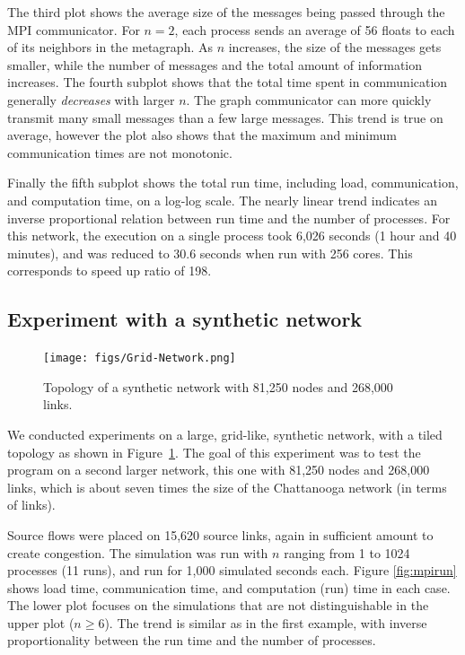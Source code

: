 The third plot shows the average size of the messages being passed through the MPI communicator. For $n=2$, each process sends an average of 56 floats to each of its neighbors in the metagraph. As $n$ increases, the size of the messages gets smaller, while the number of messages and the total amount of information increases. The fourth subplot shows that the total time spent in communication generally \textit{decreases} with larger $n$. The graph communicator can more quickly transmit many small messages than a few large messages. This trend is true on average, however the plot also shows that the maximum and minimum communication times are not monotonic. 

Finally the fifth subplot shows the total run time, including load, communication, and computation time, on a log-log scale. The nearly linear trend indicates an inverse proportional relation between run time and the number of processes.  For this network, the execution on a single process took 6,026 seconds (1 hour and 40 minutes), and was reduced to 30.6 seconds when run with 256 cores. This corresponds to speed up ratio of 198.
 
\subsection{Experiment with a synthetic network}
\begin{figure}[!ht]
    \centering
    \texttt{[image: figs/Grid-Network.png]}
    \caption{Topology of a synthetic network with 81,250 nodes and 268,000 links.}
    \label{fig:Synthetic_Network}
\end{figure}

We conducted experiments on a large, grid-like, synthetic network, with a tiled topology as shown in Figure~\ref{fig:Synthetic_Network}. The goal of this experiment was to test the program on a second larger network, this one with 81,250 nodes and 268,000 links, which is about seven times the size of the Chattanooga network (in terms of links). 

Source flows were placed on 15,620 source links, again in sufficient amount to  create congestion. The simulation was run with $n$ ranging from 1 to 1024 processes (11 runs), and run for 1,000 simulated seconds each. Figure \ref{fig:mpirun} shows load time, communication time, and computation (run) time in each case. 
The lower plot focuses on the simulations that are not distinguishable in the upper plot ($n\geq 6$). The trend is similar as in the first example, with inverse proportionality between the run time and the number of processes. 

